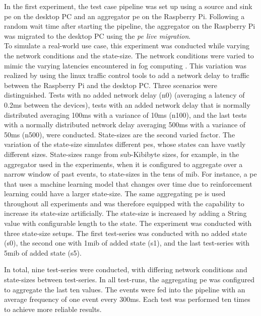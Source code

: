 In the first experiment, the test case pipeline was set up using a source and sink \gls{pe} on the desktop PC and an aggregator \gls{pe} on the Raspberry Pi. Following a random wait time after starting the pipeline, the aggregator on the Raspberry Pi was migrated to the desktop PC using the \textit{\acrshort{pe} live migration}.\\
To simulate a real-world use case, this experiment was conducted while varying the network conditions and the state-size. The network conditions were varied to mimic the varying latencies encountered in fog computing \cite{Puliafito.2018}. This variation was realized by using the linux traffic control tools to add a network delay to traffic between the Raspberry Pi and the desktop PC. Three scenarios were distinguished. Tests with no added network delay (n0) (averaging a latency of 0.2ms between the devices), tests with an added network delay that is normally distributed averaging 100ms with a variance of 10ms (n100), and the last tests with a normally distributed network delay averaging 500ms with a variance of 50ms (n500), were conducted. State-sizes are the second varied factor. The variation of the state-size simulates different \gls{pe}s, whose states can have vastly different sizes. State-sizes range from sub-Kibibyte sizes, for example, in the aggregator used in the experiments, when it is configured to aggregate over a narrow window of past events, to state-sizes in the tens of \gls{mib}. For instance, a \gls{pe} that uses a machine learning model that changes over time due to reinforcement learning could have a larger state-size. The same aggregating \gls{pe} is used throughout all experiments and was therefore equipped with the capability to increase its state-size artificially. The state-size is increased by adding a String value with configurable length to the state. The experiment was conducted with three state-size setups. The first test-series was conducted with no added state (s0), the second one with 1\gls{mib} of added state (s1), and the last test-series with 5\gls{mib} of added state (s5).\par

In total, nine test-series were conducted, with differing network conditions and state-sizes between test-series. In all test-runs, the aggregating \gls{pe} was configured to aggregate the last ten values. The events were fed into the pipeline with an average frequency of one event every 300ms. Each test was performed ten times to achieve more reliable results.\par

